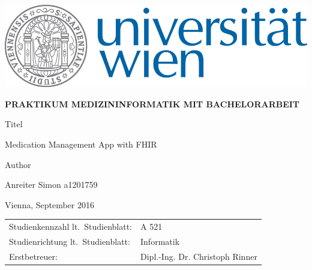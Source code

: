 \begin{titlepage}
\vspace*{-2cm}  %
\begin{flushright}
    \includegraphics{UNI-Logo_RGB_01}
\end{flushright}
\vspace{1cm}

\begin{center}  %
    \Large{\textbf{\textsf{\MakeUppercase{
        Praktikum Medizininformatik mit Bachelorarbeit
    }}}}
    \vspace{2cm}

    \large{\textsf{
        Titel
    }}
    \vspace{.1cm}

    \Large{\textsf{
        Medication Management App with FHIR
    }}
    \vspace{3cm}

    \large{\textsf{
        Author
    }}

    \Large{\textsf{
        Anreiter Simon a1201759
    }}
    \vspace{3cm}

\end{center}
\vspace{2cm}

\noindent\textsf{Vienna, September 2016}  %
\vfill

\noindent\begin{tabular}{@{}ll}
\textsf{Studienkennzahl lt.\ Studienblatt:}
&
\textsf{A 521}  %
\\
\textsf{Studienrichtung lt.\ Studienblatt:}
&
\textsf{Informatik}  %
\\
\textsf{Erstbetreuer:}
&
\textsf{Dipl.-Ing. Dr. Christoph Rinner}  %

\end{tabular}

\end{titlepage}
